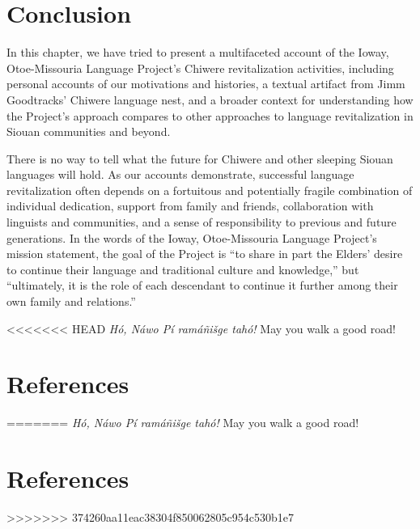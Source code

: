 \documentclass[output=paper]{LSP/langsci}
\begin{document}
\section{Conclusion}
In this chapter, we have tried to present a multifaceted account of the Ioway, Otoe-Missouria Language Project's Chiwere revitalization activities, including personal accounts of our motivations and histories, a textual artifact from Jimm Goodtracks' Chiwere language nest, and a broader context for understanding how the Project's approach compares to other approaches to language revitalization in Siouan communities and beyond.

There is no way to tell what the future for Chiwere and other sleeping Siouan languages will hold. As our accounts demonstrate, successful language revitalization often depends on a fortuitous and potentially fragile combination of individual dedication, support from family and friends, collaboration with linguists and communities, and a sense of responsibility to previous and future generations. In the words of the Ioway, Otoe-Missouria Language Project's mission statement, the goal of the Project is ``to share in part the Elders' desire to continue their language and traditional culture and knowledge,'' but ``ultimately, it is the role of each descendant to continue it further among their own family and relations.''

<<<<<<< HEAD
\emph{Hó, Náwo Pí ramáñi\v{s}ge tahó!}  May you walk a good road!

\section*{References}

=======
\emph{H\'o, N\'awo P\'i ram\'a\~ni\v{s}ge tah\'o!}  May you walk a good road!

\section*{References}

\newenvironment{reflist} {\begin{list} {} {\listparindent -.25in
\leftmargin .3in} \item \ \vspace{-.3in} } {\end{list} }
>>>>>>> 374260aa11eac38304f850062805c954c530b1e7
\end{document}
